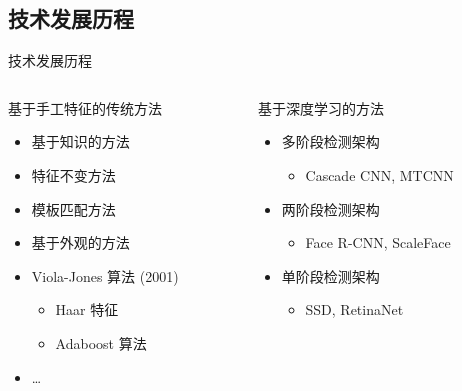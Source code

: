 \documentclass{beamer}
\begin{document}
\subsection{技术发展历程}
\begin{frame}{技术发展历程}
\begin{columns}[T]
\begin{column}{0.48\textwidth}
    基于手工特征的传统方法
    \begin{itemize}
        \item 基于知识的方法
        \item 特征不变方法
        \item 模板匹配方法
        \item 基于外观的方法
        \item Viola-Jones 算法 (2001)
        \begin{itemize}
            \item Haar 特征
            \item Adaboost 算法
        \end{itemize}
        \item \dots
    \end{itemize}
\end{column}

\begin{column}{0.48\textwidth}
    基于深度学习的方法
    \begin{itemize}
        \item 多阶段检测架构
        \begin{itemize}
            \item Cascade CNN, MTCNN
        \end{itemize}
        \item 两阶段检测架构
        \begin{itemize}
            \item Face R-CNN, ScaleFace
        \end{itemize}
        \item 单阶段检测架构
        \begin{itemize}
            \item SSD, RetinaNet
        \end{itemize}
    \end{itemize}
\end{column}
\end{columns}
\end{frame}

\end{document}
